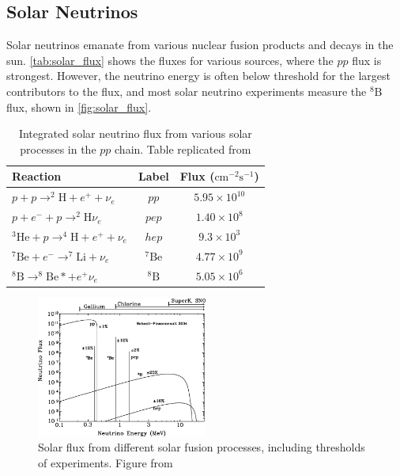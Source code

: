 \subsection{Solar Neutrinos}
Solar neutrinos emanate from various nuclear fusion products and decays in the sun. \autoref{tab:solar_flux} shows the fluxes for various sources, where the $pp$ flux is strongest. However, the neutrino energy is often below threshold for the largest contributors to the flux, and most solar neutrino experiments measure the $^{8}\text{B}$ flux, shown in \autoref{fig:solar_flux}.
\begin{table}[h]
	\begin{tabular}{l | c c}
		\hline
		\hline
		Reaction & Label & Flux ($\text{cm}^{-2} \text{s}^{-1}$) \\
		\hline
		$p+p\rightarrow ^{2}\text{H} + e^+ + \nu_e$ & $pp$ & $5.95\times10^{10}$ \\
		$p+e^-+p\rightarrow ^{2}\text{H} \nu_e$ & $pep$ & $1.40\times10^{8}$ \\
		$^{3}\text{He} + p\rightarrow ^{4}\text{H} + e^+ + \nu_e$ & $hep$ & $9.3\times10^{3}$ \\
		$^{7}\text{Be} + e^- \rightarrow ^{7}\text{Li} + \nu_e$ & $^{7}\text{Be}$ & $4.77\times10^{9}$ \\
		$^{8}\text{B} \rightarrow ^{8}\text{Be}* + e^+ \nu_e$ & $^{8}\text{B}$ & $5.05\times10^{6}$ \\
		\hline
		\hline
	\end{tabular}
	\caption{Integrated solar neutrino flux from various solar processes in the $pp$ chain. Table replicated from \cite{solar_review}}
	\label{tab:solar_flux}
\end{table}

\begin{figure}[h]
	\includegraphics[width=0.5\textwidth, trim={0mm 0mm 0mm 0mm}, clip,page=1]{figures/theory/solar_flux}
	\caption{Solar flux from different solar fusion processes, including thresholds of experiments. Figure from \cite{sno_solar_flux}}
	\label{fig:solar_flux}
\end{figure}

